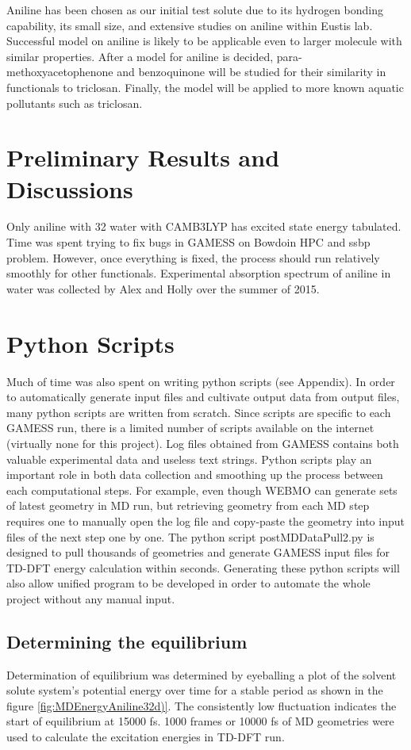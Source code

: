 \documentclass[
journal=jpcbfk, %
manuscript=article]{achemso}
\begin{document}
Aniline has been chosen as our initial test solute due to its hydrogen bonding capability, its small size, and extensive studies on aniline within Eustis lab. Successful model on aniline is likely to be applicable even to larger molecule with similar properties. After a model for aniline is decided, para-methoxyacetophenone and benzoquinone will be studied for their similarity in functionals to triclosan. Finally, the model will be applied to more known aquatic pollutants such as triclosan.

\section{Preliminary Results and Discussions}

Only aniline with 32 water with CAMB3LYP has excited state energy tabulated. Time was spent trying to fix bugs in GAMESS on Bowdoin HPC and ssbp problem. However, once everything is fixed, the process should run relatively smoothly for other functionals. Experimental absorption spectrum of aniline in water was collected by Alex and Holly over the summer of 2015. 

\section{Python Scripts}
Much of time was also spent on writing python scripts (see Appendix). In order to automatically generate input files and cultivate output data from output files, many python scripts are written from scratch. Since scripts are specific to each GAMESS run, there is a limited number of scripts available on the internet (virtually none for this project). Log files obtained from GAMESS contains both valuable experimental data and useless text strings. Python scripts play an important role in both data collection and smoothing up the process between each computational steps.  For example, even though WEBMO can generate sets of latest geometry in MD run, but retrieving geometry from each MD step requires one to manually open the log file and copy-paste the geometry into input files of the next step one by one. The python script postMDDataPull2.py is designed to pull thousands of geometries and generate GAMESS input files for TD-DFT energy calculation within seconds. Generating these python scripts will also allow unified program to be developed in order to automate the whole project without any manual input.

\subsection{Determining the equilibrium}
Determination of equilibrium was determined by eyeballing a plot of the solvent solute system's potential energy over time for a stable period as shown in the figure \ref{fig:MDEnergyAniline32d)}. The consistently low fluctuation indicates the start of equilibrium at 15000 fs. 1000 frames or 10000 fs of MD geometries were used to calculate the excitation energies in TD-DFT run.
\end{document}
